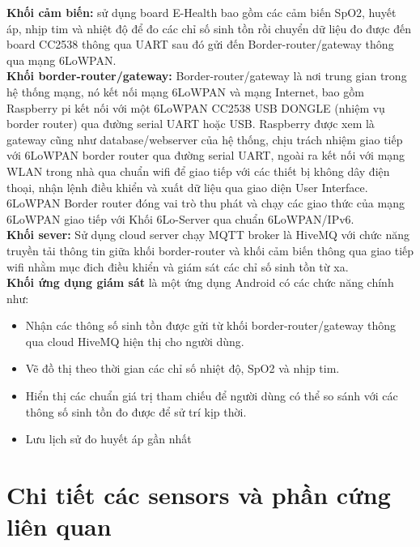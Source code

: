 \documentclass{report}
\begin{document}
\textbf{Khối cảm biến:} sử dụng board E-Health bao gồm các cảm biến SpO2, huyết áp, nhịp tim và nhiệt độ để đo các chỉ số sinh tồn rồi chuyển dữ liệu đo được đến board CC2538 thông qua UART sau đó gửi đến Border-router/gateway thông qua mạng 6LoWPAN. \\

\textbf{Khối border-router/gateway:} Border-router/gateway là nơi trung gian trong hệ thống mạng, nó kết nối mạng 6LoWPAN và mạng Internet, bao gồm Raspberry pi kết nối với một 6LoWPAN CC2538 USB DONGLE
(nhiệm vụ border router) qua đường serial UART hoặc USB. Raspberry được xem là gateway cũng như database/webserver của hệ thống, chịu trách nhiệm giao tiếp với 6LoWPAN border router qua đường serial UART, ngoài ra kết nối với mạng WLAN trong nhà qua chuẩn wifi để giao tiếp với các thiết bị không dây điện thoại, nhận lệnh điều khiển và xuất dữ liệu qua giao diện User Interface. 6LoWPAN
Border router đóng vai trò thu phát và chạy các giao thức của mạng 6LoWPAN giao tiếp với
Khối 6Lo-Server qua chuẩn 6LoWPAN/IPv6. \\

\textbf{Khối sever:} Sử dụng cloud server chạy MQTT broker là HiveMQ với chức năng
truyền tải thông tin giữa khối border-router và khối cảm biến thông qua giao
tiếp wifi nhằm mục đich điều khiển và giám sát các chỉ số sinh tồn từ xa. \\

\textbf{Khối ứng dụng giám sát} là một ứng dụng Android có các chức năng chính như:
\begin{itemize}
	\item Nhận các thông số sinh tồn được gửi từ khối border-router/gateway thông qua cloud HiveMQ hiện thị cho người dùng.
	\item Vẽ đồ thị theo thời gian các chỉ số nhiệt độ, SpO2 và nhịp tim.
	\item Hiển thị các chuẩn giá trị tham chiếu để người dùng có thể so sánh với các thông số sinh tồn đo được để sử trí kịp thời. 
	\item Lưu lịch sử đo huyết áp gần nhất
\end{itemize}
\section{Chi tiết các sensors và phần cứng liên quan}
\end{document}
